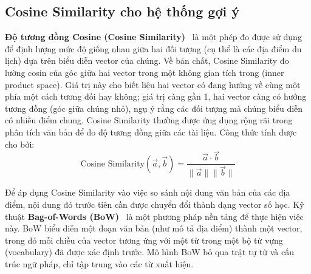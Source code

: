 \subsection{Cosine Similarity cho hệ thống gợi ý}


\textbf{Độ tương đồng Cosine (Cosine Similarity)}~\cite{cosine_similarity_concept} là một phép đo được sử dụng để định lượng mức độ giống nhau giữa hai đối tượng (cụ thể là các địa điểm du lịch) dựa trên biểu diễn vector của chúng. Về bản chất, Cosine Similarity đo lường cosin của góc giữa hai vector trong một không gian tích trong (inner product space). Giá trị này cho biết liệu hai vector có đang hướng về cùng một phía một cách tương đối hay không; giá trị càng gần 1, hai vector càng có hướng tương đồng (góc giữa chúng nhỏ), ngụ ý rằng các đối tượng mà chúng biểu diễn có nhiều điểm chung. Cosine Similarity thường được ứng dụng rộng rãi trong phân tích văn bản để đo độ tương đồng giữa các tài liệu. Công thức tính được cho bởi:
$$\text{Cosine Similarity}(\vec{a}, \vec{b}) = \frac{\vec{a} \cdot \vec{b}}{\|\vec{a}\| \|\vec{b}\|}$$

Để áp dụng Cosine Similarity vào việc so sánh nội dung văn bản của các địa điểm, nội dung đó trước tiên cần được chuyển đổi thành dạng vector số học. Kỹ thuật \textbf{Bag-of-Words (BoW)}~\cite{bow_concept} là một phương pháp nền tảng để thực hiện việc này. BoW biểu diễn một đoạn văn bản (như mô tả địa điểm) thành một vector, trong đó mỗi chiều của vector tương ứng với một từ trong một bộ từ vựng (vocabulary) đã được xác định trước. Mô hình BoW bỏ qua trật tự từ và cấu trúc ngữ pháp, chỉ tập trung vào các từ xuất hiện.
